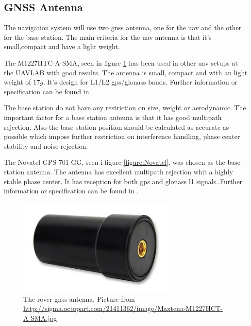 \subsection{GNSS Antenna}
The navigation system will use two \gls{gnss} antenna, one for the \gls{uav} and the other for the base station. The main criteria for the \gls{uav} antenna is that it's small,compact and have a light weight.

The M1227HTC-A-SMA, seen in figure \ref{figure:Maxtena} has been used in other \gls{uav} setups at the UAVLAB with good results. The antenna is small, compact and with an light weight of $17g$. It's design for L1/L2 gps/glonass bands. Further information or specification can be found in \citep{maxtena}

The base station do not have any restriction on size, weight or aerodynamic. The important factor for a base station antenna is that it has good multipath rejection. Also the base station position should be calculated as accurate as possible which impose further restriction on interference handling, phase center stability and noise rejection.

The Novatel GPS-701-GG, seen i figure \ref{figure:Novatel}, was chosen as the base station antenna. The antenna has excellent multipath rejection whit a highly stable phase center. It has reception for both \gls{gps} and \gls{glonass} \gls{l1} signals..Further information or specification can be found in \citep{novatel}.

\begin{figure}[H]
	\centering
		\includegraphics[width=0.7\textwidth]{figs/Maxtena-M1227HCT-A-SMA-image.jpg}
		\caption{The rover \gls{gnss} antenna, Picture from \url{http://sigma.octopart.com/21411362/image/Maxtena-M1227HCT-A-SMA.jpg}}
		\label{figure:Maxtena}
\end{figure}

